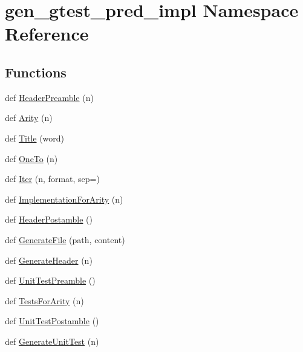 \hypertarget{namespacegen__gtest__pred__impl}{}\section{gen\+\_\+gtest\+\_\+pred\+\_\+impl Namespace Reference}
\label{namespacegen__gtest__pred__impl}
\subsection*{Functions}
\begin{DoxyCompactItemize}
\item 
def \hyperlink{namespacegen__gtest__pred__impl_a0b99cadcffab4bf161654a382163bac8}{Header\+Preamble} (n)
\item 
def \hyperlink{namespacegen__gtest__pred__impl_a5bbb7272f3588b969ab3ded6f49836a1}{Arity} (n)
\item 
def \hyperlink{namespacegen__gtest__pred__impl_ae49dd9bd9152dbcb3ca7994ce04c37ba}{Title} (word)
\item 
def \hyperlink{namespacegen__gtest__pred__impl_a7920598d51c9dded76a4ef9ffde339e4}{One\+To} (n)
\item 
def \hyperlink{namespacegen__gtest__pred__impl_ac016218b7c9437d1d5ac85c574c83069}{Iter} (n, format, sep=\textquotesingle{}\textquotesingle{})
\item 
def \hyperlink{namespacegen__gtest__pred__impl_a8c53b141b89f9c05d0131d9756dfeab0}{Implementation\+For\+Arity} (n)
\item 
def \hyperlink{namespacegen__gtest__pred__impl_a3d40c7ef70cf4d46e56c9612f34027bf}{Header\+Postamble} ()
\item 
def \hyperlink{namespacegen__gtest__pred__impl_a16210fe365dfd176e04aa2578ac5a8d9}{Generate\+File} (path, content)
\item 
def \hyperlink{namespacegen__gtest__pred__impl_a6f3039a82a5283846fb272f8a3af6743}{Generate\+Header} (n)
\item 
def \hyperlink{namespacegen__gtest__pred__impl_ae52dc86461d1b666c7b658a8c27c69f9}{Unit\+Test\+Preamble} ()
\item 
def \hyperlink{namespacegen__gtest__pred__impl_ab0da913fa15e5695d5bb2dd1de5dec57}{Tests\+For\+Arity} (n)
\item 
def \hyperlink{namespacegen__gtest__pred__impl_a57b922f50d0807896496dcd883c1f098}{Unit\+Test\+Postamble} ()
\item 
def \hyperlink{namespacegen__gtest__pred__impl_acbd42b5b7fb7ddbb06a4dd58fc37e9ed}{Generate\+Unit\+Test} (n)
\end{DoxyCompactItemize}
